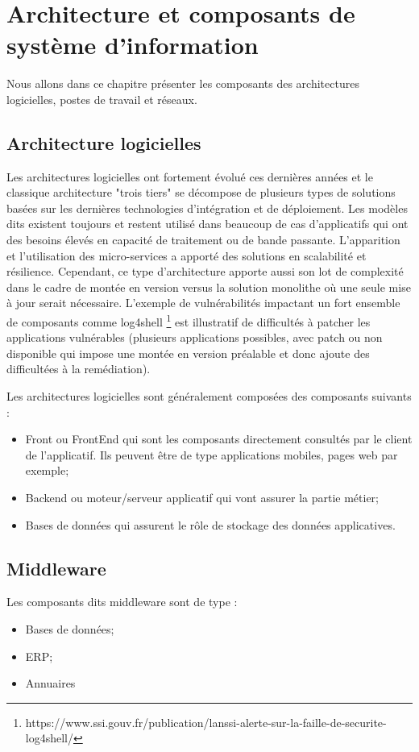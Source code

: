 \section{Architecture et composants de système d’information}
Nous allons dans ce chapitre présenter les composants des architectures logicielles, postes de travail et réseaux. 

\subsection{Architecture logicielles}
Les architectures logicielles ont fortement évolué ces dernières années et le classique architecture "trois tiers" se décompose de plusieurs types de solutions basées sur les dernières technologies d'intégration et de déploiement.
Les modèles dits  existent toujours et restent utilisé dans beaucoup de cas d'applicatifs qui ont des besoins élevés en capacité de traitement ou de bande passante.
L'apparition et l'utilisation des micro-services a apporté des solutions en scalabilité et résilience. 
Cependant, ce type d'architecture apporte aussi son lot de complexité dans le cadre de montée en version versus la solution monolithe où une seule mise à jour serait nécessaire. L'exemple de vulnérabilités impactant un fort ensemble de composants comme log4shell \footnote{https://www.ssi.gouv.fr/publication/lanssi-alerte-sur-la-faille-de-securite-log4shell/} est illustratif de difficultés à patcher les applications vulnérables (plusieurs applications possibles, avec patch ou non disponible qui impose une montée en version préalable et donc ajoute des difficultées à la remédiation).

Les architectures logicielles sont généralement composées des composants suivants :
\begin{itemize}
    \item Front ou FrontEnd qui sont les composants directement consultés par le client de l'applicatif. Ils peuvent être de type applications mobiles, pages web par exemple;
    \item Backend ou moteur/serveur applicatif qui vont assurer la partie métier;
    \item Bases de données qui assurent le rôle de stockage des données applicatives.
\end{itemize}

\subsection{Middleware}
Les composants dits middleware sont de type : 
\begin{itemize}
    \item Bases de données;
    \item ERP;
    \item Annuaires 
\end{itemize}

